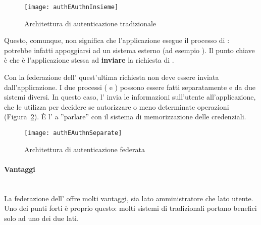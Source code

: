 \begin{figure}[hbpc]
\begin{center}
\texttt{[image: authEAuthnInsieme]}
\caption[Architettura di autenticazione tradizionale]{Architettura di autenticazione tradizionale\protect\footnotemark}
\label{fig:authTrad}
\end{center}
\end{figure}

Questo, comunque, non significa che l'applicazione esegue il processo di : potrebbe infatti appoggiarsi ad un sistema esterno (ad esempio ). Il punto chiave è che è l'applicazione stessa ad \textbf{inviare} la richiesta di .

Con la federazione dell' quest'ultima richiesta non deve essere inviata dall'applicazione. I due processi ( e ) possono essere fatti separatamente e da due sistemi diversi. In questo caso, l' invia le informazioni sull'utente all'applicazione, che le utilizza per decidere se autorizzare o meno determinate operazioni (Figura~\ref{fig:authFed}). È l' a ''parlare'' con il sistema di memorizzazione delle credenziali.

\begin{figure}[h]
\begin{center}
\texttt{[image: authEAuthnSeparate]}
\caption[Architettura di autenticazione federata]{Architettura di autenticazione federata\protect\footnotemark}
\label{fig:authFed}
\end{center}
\end{figure}

\paragraph{Vantaggi} \mbox{} \\
La federazione dell' offre molti vantaggi, sia lato amministratore che lato utente. Uno dei punti forti è proprio questo: molti sistemi di  tradizionali portano benefici solo ad uno dei due lati.

